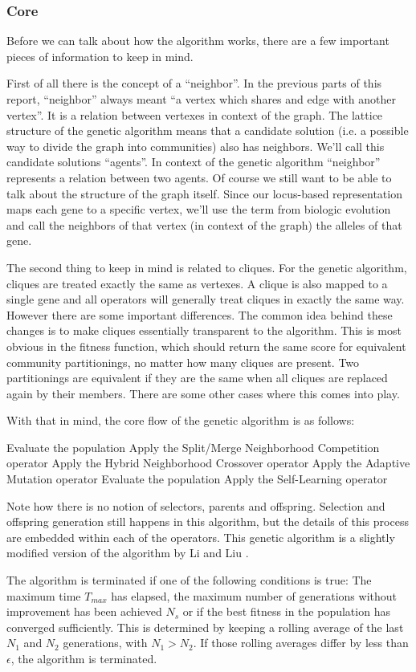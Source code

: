 \subsubsection{Core}
Before we can talk about how the algorithm works, there are a few important pieces of information to keep in mind. 
\par
First of all there is the concept of a ``neighbor''. In the previous parts of this report, ``neighbor'' always meant ``a vertex which shares and edge with another vertex''. It is a relation between vertexes in context of the graph. The lattice structure of the genetic algorithm means that a candidate solution (i.e. a possible way to divide the graph into communities) also has neighbors. We'll call this candidate solutions ``agents''. In context of the genetic algorithm ``neighbor'' represents a relation between two agents. Of course we still want to be able to talk about the structure of the graph itself. Since our locus-based representation maps each gene to a specific vertex, we'll use the term from biologic evolution and call the neighbors of that vertex (in context of the graph) the alleles of that gene.
\par
The second thing to keep in mind is related to cliques. For the genetic algorithm, cliques are treated exactly the same as vertexes. A clique is also mapped to a single gene and all operators will generally treat cliques in exactly the same way. However there are some important differences. The common idea behind these changes is to make cliques essentially transparent to the algorithm. This is most obvious in the fitness function, which should return the same score for equivalent community partitionings, no matter how many cliques are present. Two partitionings are equivalent if they are the same when all cliques are replaced again by their members. There are some other cases where this comes into play.
\par
With that in mind, the core flow of the genetic algorithm is as follows:
\begin{algorithmic}[1]
\STATE Evaluate the population
\STATE Apply the Split/Merge Neighborhood Competition operator
\STATE Apply the Hybrid Neighborhood Crossover operator
\STATE Apply the Adaptive Mutation operator
\STATE Evaluate the population
\STATE Apply the Self-Learning operator
\end{algorithmic}
Note how there is no notion of selectors, parents and offspring. Selection and offspring generation still happens in this algorithm, but the details of this process are embedded within each of the operators. This genetic algorithm is a slightly modified version of the algorithm by Li and Liu \cite{Li2016}.
\par
The algorithm is terminated if one of the following conditions is true: The maximum time $T_{max}$ has elapsed, the maximum number of generations without improvement has been achieved $N_{s}$ or if the best fitness in the population has converged sufficiently. This is determined by keeping a rolling average of the last $N_1$ and $N_2$ generations, with $N_1 > N_2$. If those rolling averages differ by less than $\epsilon$, the algorithm is terminated.  
